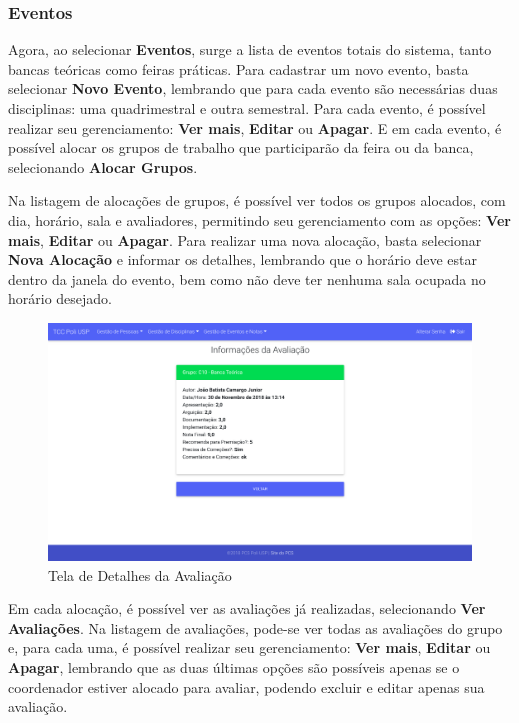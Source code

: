 \subsubsection{Eventos}
Agora, ao selecionar \textbf{Eventos}, surge a lista de eventos totais do sistema, tanto bancas teóricas como feiras práticas. Para cadastrar um novo evento, basta selecionar \textbf{Novo Evento}, lembrando que para cada evento são necessárias duas disciplinas: uma quadrimestral e outra semestral. Para cada evento, é possível realizar seu gerenciamento: \textbf{Ver mais}, \textbf{Editar} ou \textbf{Apagar}. E em cada evento, é possível alocar os grupos de trabalho que participarão da feira ou da banca, selecionando \textbf{Alocar Grupos}.

Na listagem de alocações de grupos, é possível ver todos os grupos alocados, com dia, horário, sala e avaliadores, permitindo seu gerenciamento com as opções: \textbf{Ver mais}, \textbf{Editar} ou \textbf{Apagar}. Para realizar uma nova alocação, basta selecionar \textbf{Nova Alocação} e informar os detalhes, lembrando que o horário deve estar dentro da janela do evento, bem como não deve ter nenhuma sala ocupada no horário desejado.

\begin{figure}[H]
    \centering
    \includegraphics[scale=0.3]{imagens/tela_detalhes_avaliacao.png}
    \caption{Tela de Detalhes da Avaliação}
    \label{fig:evaluations-show}
\end{figure}

Em cada alocação, é possível ver as avaliações já realizadas, selecionando \textbf{Ver Avaliações}. Na listagem de avaliações, pode-se ver todas as avaliações do grupo e, para cada uma, é possível realizar seu gerenciamento: \textbf{Ver mais}, \textbf{Editar} ou \textbf{Apagar}, lembrando que as duas últimas opções são possíveis apenas se o coordenador estiver alocado para avaliar, podendo excluir e editar apenas sua avaliação.

